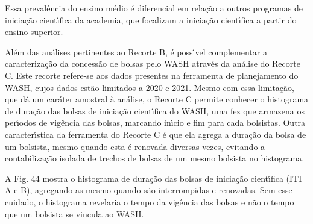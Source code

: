 \documentclass[
12pt,		%
openright,	%
twoside,  %
a4paper,			%
chapter=TITLE,		%
english,			%
french,				%
spanish,			%
brazil				%
]{USPSC-classe/USPSC}
\begin{document}
Essa preval\^encia do ensino m\'edio \'e diferencial em rela\c{c}\~ao a outros programas de inicia\c{c}\~ao cient\'{\i}fica da academia, que focalizam a inicia\c{c}\~ao cient\'{\i}fica a partir do ensino superior.








Al\'em das an\'alises pertinentes ao Recorte B, \'e poss\'{\i}vel complementar a caracteriza\c{c}\~ao da concess\~ao de bolsas pelo WASH atrav\'es da an\'alise do Recorte C. Este recorte refere-se aos dados presentes na ferramenta de planejamento do WASH, cujos dados est\~ao limitados a 2020 e 2021. Mesmo com essa limita\c{c}\~ao, que d\'a um car\'ater amostral \`a an\'alise, o Recorte C permite conhecer o histograma de dura\c{c}\~ao das bolsas de inicia\c{c}\~ao cient\'{\i}fica do WASH, uma fez que armazena os per\'{\i}odos de vig\^encia das bolsas, marcando in\'{\i}cio e fim para cada bolsistas. Outra caracter\'{\i}stica da ferramenta do Recorte C \'e que ela agrega a dura\c{c}\~ao da bolsa de um bolsista, mesmo quando esta \'e renovada diversas vezes, evitando a contabiliza\c{c}\~ao isolada de trechos de bolsas de um mesmo bolsista no histograma.








A Fig. 44 mostra o histograma de dura\c{c}\~ao das bolsas de inicia\c{c}\~ao cient\'{\i}fica (ITI A e B), agregando-as mesmo quando s\~ao interrompidas e renovadas. Sem esse cuidado, o histograma revelaria o tempo da vig\^encia das bolsas e n\~ao o tempo que um bolsista se vincula ao WASH.
\end{document}

